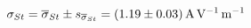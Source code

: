 
\begin{equation}
    \sigma_{St}
        = \overline{\sigma}_{St} \pm s_{\overline{\sigma}_{St}}
        = \SI[separate-uncertainty = true]{1.19 \pm 0.03}{\ampere\per\volt\per\meter}
\end{equation}
